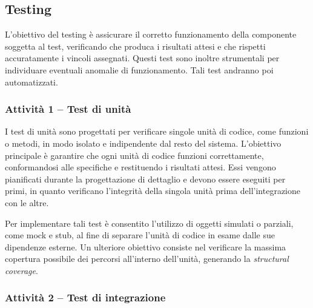\documentclass[a4paper, 11pt, oneside]{scrartcl}
\begin{document}
\subsection{Testing}
\label{sec:testing}

L'obiettivo del testing è assicurare il corretto funzionamento della componente soggetta al test{\scriptsize{}}, verificando che produca i risultati attesi e che rispetti accuratamente i vincoli assegnati. Questi test sono inoltre strumentali per individuare eventuali anomalie di funzionamento.
Tali test andranno poi automatizzati.

\subsubsection{Attività 1 -- Test di unità}

I test di unità sono progettati per verificare singole unità di codice, come funzioni o metodi, in modo isolato e indipendente dal resto del sistema{\scriptsize{}}. L'obiettivo principale è garantire che ogni unità di codice funzioni correttamente, conformandosi alle specifiche e restituendo i risultati attesi.
Essi vengono pianificati durante la progettazione di dettaglio e devono essere eseguiti per primi, in quanto verificano l'integrità della singola unità prima dell'integrazione con le altre.

Per implementare tali test è consentito l'utilizzo di oggetti simulati o parziali, come mock e stub, al fine di separare l'unità di codice in esame dalle sue dipendenze esterne. Un ulteriore obiettivo consiste nel verificare la massima copertura possibile dei percorsi all'interno dell'unità, generando la \emph{structural coverage}.

\subsubsection{Attività 2 -- Test di integrazione}
\end{document}
